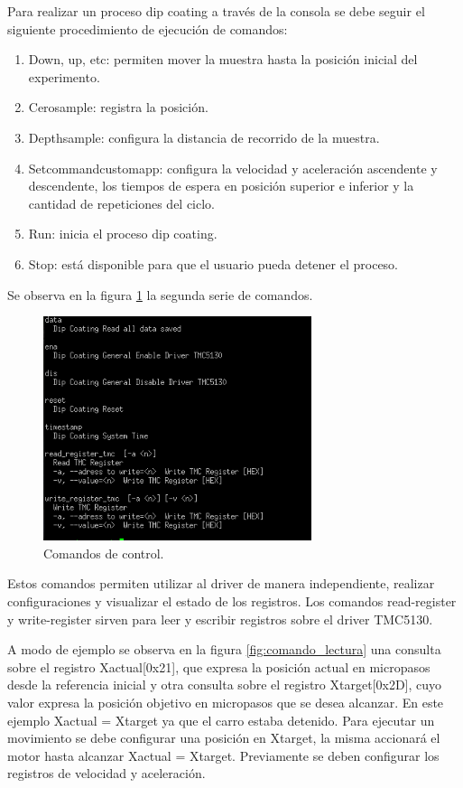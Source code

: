 Para realizar un proceso dip coating a través de la consola se debe seguir el siguiente procedimiento de ejecución de comandos:
\begin{enumerate}
\item Down, up, etc: permiten mover la muestra hasta la posición inicial del experimento.
\item Cerosample: registra la posición.
\item Depthsample: configura la distancia de recorrido de la muestra.
\item Setcommandcustomapp: configura la velocidad y aceleración ascendente y descendente, los tiempos de espera en posición superior e inferior y la cantidad de repeticiones del ciclo.
\item Run: inicia el proceso dip coating.
\item Stop: está disponible para que el usuario pueda detener el proceso.

\end{enumerate}


Se observa en la figura \ref{fig:consola_comandos} la segunda serie de comandos. 

\begin{figure}[h!]
	\centering
	\includegraphics[width=0.7\textwidth]{./Figures/consola_3.png}
	\caption{Comandos de control.}
	\label{fig:consola_comandos}
\end{figure}

Estos comandos permiten utilizar al driver de manera independiente, realizar configuraciones y visualizar el estado de los registros.
Los comandos read-register y write-register sirven para leer y escribir registros sobre el driver TMC5130.

A modo de ejemplo se observa en la figura \ref{fig:comando_lectura} una consulta sobre el registro Xactual[0x21], que expresa la posición actual en micropasos desde la referencia inicial y otra consulta sobre el registro Xtarget[0x2D], cuyo valor expresa la posición objetivo en micropasos que se desea alcanzar. En este ejemplo Xactual = Xtarget ya que el carro estaba detenido. Para ejecutar un movimiento se debe configurar una posición en Xtarget, la misma accionará el motor hasta alcanzar Xactual = Xtarget. Previamente se deben configurar los registros de velocidad y aceleración.


